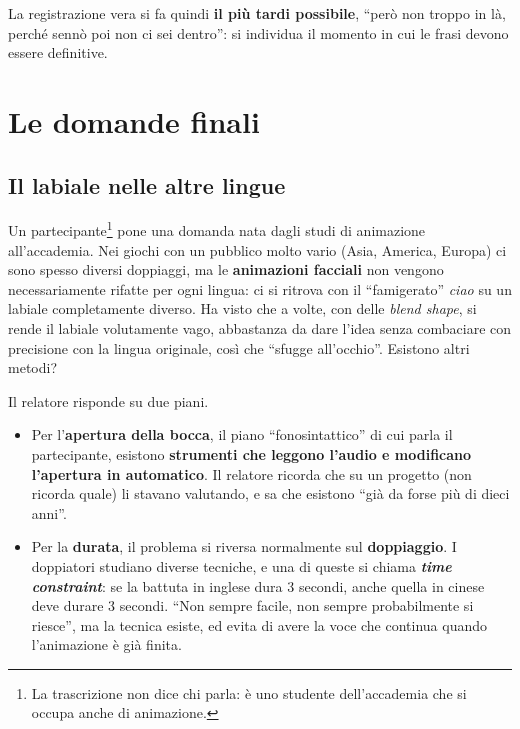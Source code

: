 La registrazione vera si fa quindi \textbf{il più tardi possibile}, ``però non
troppo in là, perché sennò poi non ci sei dentro'': si individua il momento in
cui le frasi devono essere definitive.

\section{Le domande finali}
\label{z9:sec:domande}

\subsection{Il labiale nelle altre lingue}

Un partecipante\footnote{La trascrizione non dice chi parla: è uno studente
dell'accademia che si occupa anche di animazione.} pone una domanda nata dagli
studi di animazione all'accademia. Nei giochi con un pubblico molto vario
(Asia, America, Europa) ci sono spesso diversi doppiaggi, ma le
\textbf{animazioni facciali} non vengono necessariamente rifatte per ogni lingua:
ci si ritrova con il ``famigerato'' \emph{ciao} su un labiale completamente
diverso. Ha visto che a volte, con delle \emph{blend shape}, si rende il labiale
volutamente vago, abbastanza da dare l'idea senza combaciare con precisione con
la lingua originale, così che ``sfugge all'occhio''. Esistono altri metodi?

Il relatore risponde su due piani.
\begin{itemize}
  \item Per l'\textbf{apertura della bocca}, il piano ``fonosintattico'' di cui
        parla il partecipante, esistono \textbf{strumenti che leggono l'audio e
        modificano l'apertura in automatico}. Il relatore ricorda che su un
        progetto (non ricorda quale) li stavano valutando, e sa che esistono
        ``già da forse più di dieci anni''.
  \item Per la \textbf{durata}, il problema si riversa normalmente sul
        \textbf{doppiaggio}. I doppiatori studiano diverse tecniche, e una di
        queste si chiama \textbf{\emph{time constraint}}: se la battuta in
        inglese dura 3 secondi, anche quella in cinese deve durare 3 secondi.
        ``Non sempre facile, non sempre probabilmente si riesce'', ma la tecnica
        esiste, ed evita di avere la voce che continua quando l'animazione è già
        finita.
\end{itemize}

